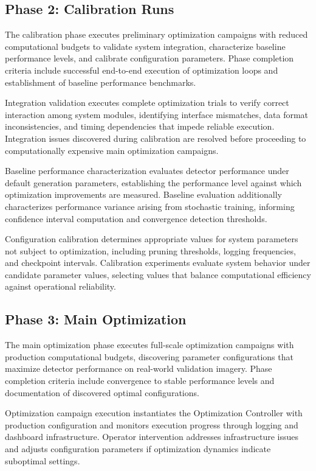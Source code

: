 \subsection{Phase 2: Calibration Runs}

The calibration phase executes preliminary optimization campaigns with reduced computational budgets to validate system integration, characterize baseline performance levels, and calibrate configuration parameters. Phase completion criteria include successful end-to-end execution of optimization loops and establishment of baseline performance benchmarks.

Integration validation executes complete optimization trials to verify correct interaction among system modules, identifying interface mismatches, data format inconsistencies, and timing dependencies that impede reliable execution. Integration issues discovered during calibration are resolved before proceeding to computationally expensive main optimization campaigns.

Baseline performance characterization evaluates detector performance under default generation parameters, establishing the performance level against which optimization improvements are measured. Baseline evaluation additionally characterizes performance variance arising from stochastic training, informing confidence interval computation and convergence detection thresholds.

Configuration calibration determines appropriate values for system parameters not subject to optimization, including pruning thresholds, logging frequencies, and checkpoint intervals. Calibration experiments evaluate system behavior under candidate parameter values, selecting values that balance computational efficiency against operational reliability.

\subsection{Phase 3: Main Optimization}

The main optimization phase executes full-scale optimization campaigns with production computational budgets, discovering parameter configurations that maximize detector performance on real-world validation imagery. Phase completion criteria include convergence to stable performance levels and documentation of discovered optimal configurations.

Optimization campaign execution instantiates the Optimization Controller with production configuration and monitors execution progress through logging and dashboard infrastructure. Operator intervention addresses infrastructure issues and adjusts configuration parameters if optimization dynamics indicate suboptimal settings.

